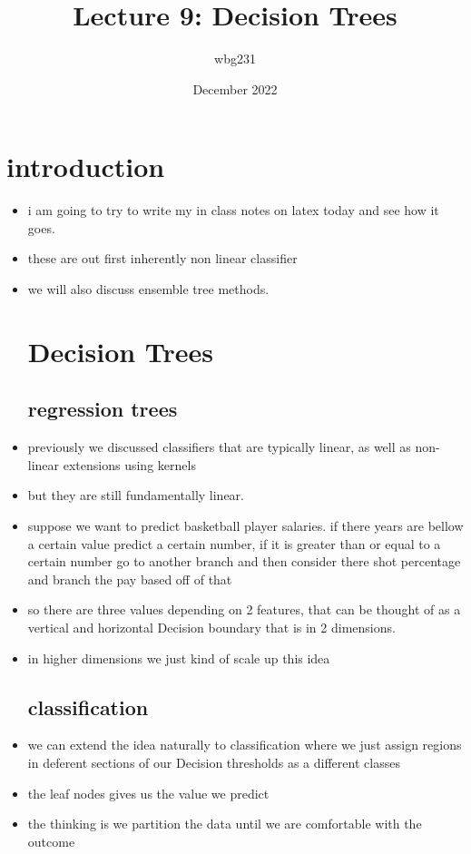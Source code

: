\documentclass{article}
\title{Lecture 9: Decision Trees }
\author{wbg231 }
\date{December 2022}
\begin{document}
\maketitle

\section*{introduction}
\begin{itemize}
\item i am going to try to write my in class notes on latex today and see how it goes. 
\item these are out first inherently non linear classifier 
\item we will also discuss ensemble tree methods. 
\section*{Decision Trees}
\subsection*{regression trees }
\item previously we discussed classifiers that are typically linear, as well as non-linear extensions using kernels 
\item but they are still fundamentally linear. 
\item suppose we want to predict basketball player salaries. if there years are bellow a certain value
predict a certain number, if it is greater than or equal to a certain number go to another branch and then consider there shot percentage and branch the pay based off of that 
\item so there are three values depending on 2 features, that can be thought of as a vertical and horizontal Decision boundary that is in 2 dimensions. 
\item in higher dimensions we just kind of scale up this idea
\subsection*{classification}
\item we can extend the idea naturally to classification where we just assign regions in deferent sections of our Decision thresholds as a different classes
\item the leaf nodes gives us the value we predict 
\item the thinking is we partition the data until we are comfortable with the outcome 

\end{itemize}
\end{document}
